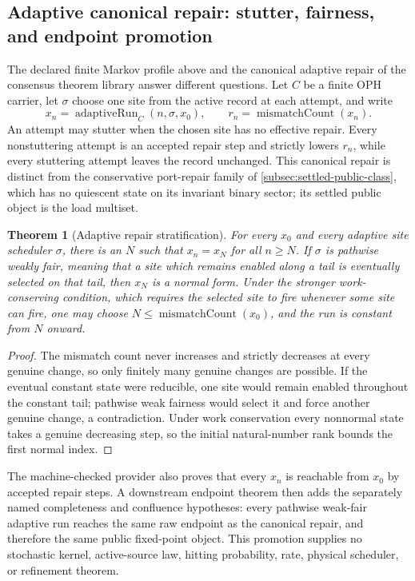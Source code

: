 \documentclass[11pt]{article}
\newtheorem{theorem}{Theorem}[section]
\theoremstyle{definition}
\theoremstyle{remark}
\numberwithin{equation}{section}
\begin{document}
\subsection{Adaptive canonical repair: stutter, fairness, and endpoint promotion}

The declared finite Markov profile above and the canonical adaptive repair
of the consensus theorem library answer different questions.  Let \(C\) be a finite OPH
carrier, let \(\sigma\) choose one site from the active record at each attempt,
and write
\[
x_n=\operatorname{adaptiveRun}_C(n,\sigma,x_0),
\qquad r_n=\operatorname{mismatchCount}(x_n).
\]
An attempt may stutter when the chosen site has no effective repair.  Every
nonstuttering attempt is an accepted repair step and strictly lowers \(r_n\),
while every stuttering attempt leaves the record unchanged.
This canonical repair is distinct from the conservative port-repair family of
\cref{subsec:settled-public-class}, which has no quiescent state on its
invariant binary sector; its settled public object is the load multiset.

\begin{theorem}[Adaptive repair stratification]
\label{thm:oph-adaptive-repair-stratification}
For every \(x_0\) and every adaptive site scheduler \(\sigma\), there is an
\(N\) such that \(x_n=x_N\) for all \(n\ge N\).  If \(\sigma\) is pathwise
weakly fair, meaning that a site which remains enabled along a tail is
eventually selected on that tail, then \(x_N\) is a normal form.  Under the
stronger work-conserving condition, which requires the selected site to fire
whenever some site can fire, one may choose
\(N\le\operatorname{mismatchCount}(x_0)\), and the run is constant from
\(N\) onward.
\end{theorem}

\begin{proof}
The mismatch count never increases and strictly decreases at every genuine
change, so only finitely many genuine changes are possible.  If the eventual
constant state were reducible, one site would remain enabled throughout the
constant tail; pathwise weak fairness would select it and force another
genuine change, a contradiction.  Under work conservation every nonnormal
state takes a genuine decreasing step, so the initial natural-number rank
bounds the first normal index.
\end{proof}

The machine-checked provider also proves that every \(x_n\) is reachable from
\(x_0\) by accepted repair steps.  A downstream endpoint theorem then adds the
separately named completeness and confluence hypotheses: every pathwise
weak-fair adaptive run reaches the same raw endpoint as the canonical repair,
and therefore the same public fixed-point object.  This promotion supplies no
stochastic kernel, active-source law, hitting probability, rate, physical
scheduler, or refinement theorem.
\end{document}
